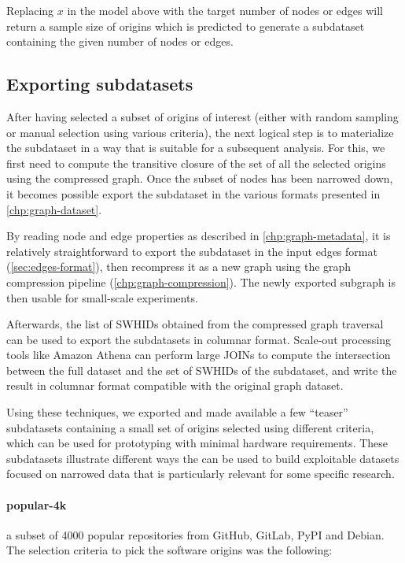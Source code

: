 Replacing $x$ in the model above with the target number of nodes or edges will
return a sample size of origins which is predicted to generate a subdataset
containing the given number of nodes or edges.

\subsection{Exporting subdatasets}

After having selected a subset of origins of interest (either with random
sampling or manual selection using various criteria), the next logical step is
to materialize the subdataset in a way that is suitable for a subsequent
analysis.
For this, we first need to compute the transitive closure of the set of all the
selected origins using the compressed graph. Once the subset of nodes has been
narrowed down, it becomes possible export the subdataset in the various formats
presented in \cref{chp:graph-dataset}.

By reading node and edge properties as described in
\cref{chp:graph-metadata}, it is relatively straightforward to export the
subdataset in the input edges format (\cref{sec:edges-format}), then recompress
it as a new graph using the graph compression pipeline
(\cref{chp:graph-compression}). The newly exported subgraph is then usable for
small-scale experiments.

Afterwards, the list of \glspl{SWHID} obtained from the compressed graph
traversal can be used to export the subdatasets in columnar format. Scale-out
processing tools like Amazon Athena can perform large JOINs to compute the
intersection between the full dataset and the set of \glspl{SWHID} of the
subdataset, and write the result in columnar format compatible with the
original graph dataset.

Using these techniques, we exported and made available a few ``teaser''
subdatasets containing a small set of origins selected using different
criteria, which can be used for prototyping with minimal hardware requirements.
These subdatasets illustrate different ways the \SWHGD{} can be used to build
exploitable datasets focused on narrowed data that is particularly relevant for
some specific research.

\paragraph{popular-4k} a subset of 4000 popular repositories from
GitHub, GitLab, PyPI and Debian. The selection criteria to pick the software
origins was the following:

